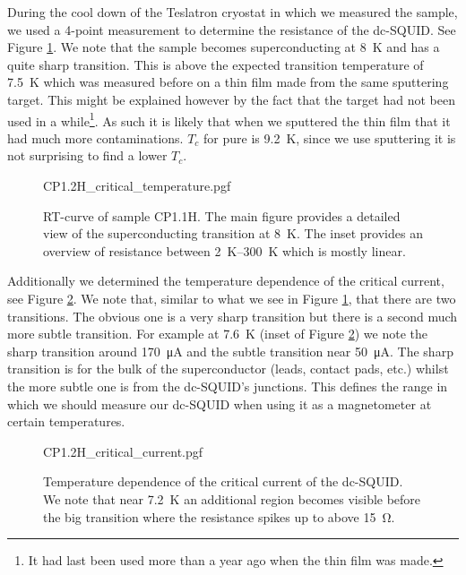 During the cool down of the Teslatron cryostat in which we measured the sample, we used a 4-point measurement to determine the resistance of the dc-SQUID. See Figure \ref{fig:CP1.1H-SQUID-RT}. We note that the sample becomes superconducting at \qty{8}{\kelvin} and has a quite sharp transition. This is above the expected transition temperature of \qty{7.5}{\kelvin} which was measured before on a thin film made from the same sputtering target. This might be explained however by the fact that the  target had not been used in a while\footnote{It had last been used more than a year ago when the thin film was made.}. As such it is likely that when we sputtered the thin film that it had much more contaminations. $T_c$ for pure  is \qty{9.2}{\kelvin}\cite{maxfieldSuperconductingPenetrationDepth1965}, since we use sputtering it is not surprising to find a lower $T_c$.

\begin{figure}[h]
	\centering
	{CP1.2H_critical_temperature.pgf}
	\caption{
		RT-curve of sample CP1.1H. The main figure provides a detailed view of the superconducting transition at \qty{8}{\kelvin}. The inset provides an overview of resistance between \qtyrange{2}{300}{\kelvin} which is mostly linear.
	}
	\label{fig:CP1.1H-SQUID-RT}
\end{figure}

Additionally we determined the temperature dependence of the critical current, see Figure \ref{fig:CP1.1H-SQUID-critical-current-temperature-dependence}. We note that, similar to what we see in Figure \ref{fig:CP1.1H-SQUID-RT}, that there are two transitions. The obvious one is a very sharp transition but there is a second much more subtle transition. For example at \qty{7.6}{\kelvin} (inset of Figure \ref{fig:CP1.1H-SQUID-critical-current-temperature-dependence}) we note the sharp transition around \qty{170}{\micro\ampere} and the subtle transition near \qty{50}{\micro\ampere}. The sharp transition is for the bulk of the superconductor (leads, contact pads, etc.) whilst the more subtle one is from the dc-SQUID's junctions. This defines the range in which we should measure our dc-SQUID when using it as a magnetometer at certain temperatures.

\begin{figure}[h]
	\centering
	{CP1.2H_critical_current.pgf}
	\caption{Temperature dependence of the critical current of the dc-SQUID. We note that near \qty{7.2}{\kelvin} an additional region becomes visible before the big transition where the resistance spikes up to above \qty{15}{\ohm}.}
	\label{fig:CP1.1H-SQUID-critical-current-temperature-dependence}
\end{figure}


